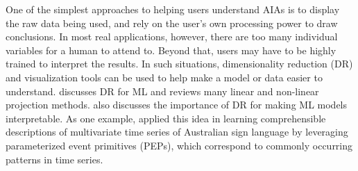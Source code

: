 One of the simplest approaches to helping users understand AIAs is to display the raw data being used, and rely on the user's own processing power to draw conclusions. In most real applications, however, there are too many individual variables for a human to attend to. Beyond that, users may have to be highly trained to interpret the results. In such situations, dimensionality reduction (DR) and visualization tools can be used to help make a model or data easier to understand. \citet{Venna2007-yj} discusses DR for ML and reviews many linear and non-linear projection methods. \citet{Vellido2012-nm} also discusses the importance of DR for making ML models interpretable. As one example, \citet{Kadous1999-rx} applied this idea in learning comprehensible descriptions of multivariate time series of Australian sign language by leveraging parameterized event primitives (PEPs), which correspond to commonly occurring patterns in time series.  %

